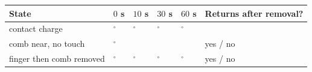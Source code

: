 
\begin{center}\small
\begin{tabularx}{\linewidth}{@{}p{.24\linewidth}p{.13\linewidth}p{.13\linewidth}p{.13\linewidth}p{.13\linewidth}L@{}}
\toprule
State & \(0\) s & \(10\) s & \(30\) s & \(60\) s & Returns after removal?\\
\midrule
contact charge & \(^\circ\) & \(^\circ\) & \(^\circ\) & \(^\circ\) & \\[1.35em]
comb near, no touch & \(^\circ\) & & & & yes / no\\[1.35em]
finger then comb removed & \(^\circ\) & \(^\circ\) & \(^\circ\) & \(^\circ\) & yes / no\\
\bottomrule
\end{tabularx}
\end{center}

\lowvoltagenote

